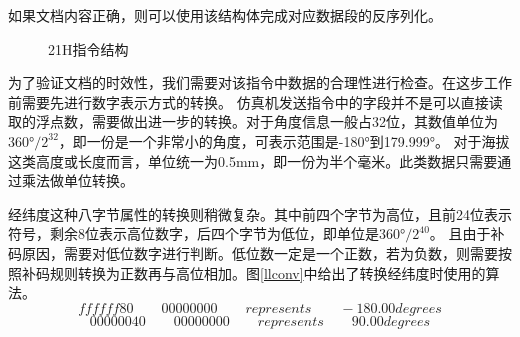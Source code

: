 如果文档内容正确，则可以使用该结构体完成对应数据段的反序列化。
\begin{figure}[h!]
    \centering
     
    \caption{21H指令结构}
    \label{21h}
\end{figure}
\par
为了验证文档的时效性，我们需要对该指令中数据的合理性进行检查。在这步工作前需要先进行数字表示方式的转换。
仿真机发送指令中的字段并不是可以直接读取的浮点数，需要做出进一步的转换。对于角度信息一般占32位，其数值单位为$360°/2^{32}$，即一份是一个非常小的角度，可表示范围是-180°到179.999°。
对于海拔这类高度或长度而言，单位统一为0.5mm，即一份为半个毫米。此类数据只需要通过乘法做单位转换。
\par
经纬度这种八字节属性的转换则稍微复杂。其中前四个字节为高位，且前24位表示符号，剩余8位表示高位数字，后四个字节为低位，即单位是$360°/2^{40}$。
且由于补码原因，需要对低位数字进行判断。低位数一定是一个正数，若为负数，则需要按照补码规则转换为正数再与高位相加。图\ref{llconv}中给出了转换经纬度时使用的算法。
$$ffffff80 \qquad 00000000 \qquad represents \qquad -180.00degrees$$
$$00000040 \qquad 00000000 \qquad represents \qquad 90.00 degrees$$


